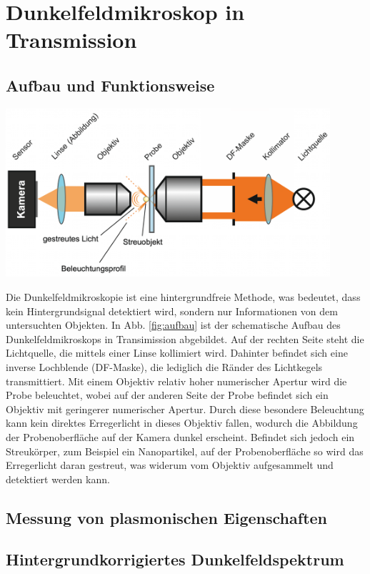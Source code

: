 
\section{Dunkelfeldmikroskop in Transmission}
\label{sec:mikroskop}

\subsection{Aufbau und Funktionsweise}
\label{sub:aufbau}

\begin{center}
    \captionsetup{type = figure}
    \includegraphics[width = 0.9\textwidth]{Bilder/Aufbau_Dunkelfeld.png}
    \label{fig:aufbau}
\end{center}

Die Dunkelfeldmikroskopie ist eine hintergrundfreie Methode, was bedeutet, dass kein Hintergrundsignal detektiert wird, sondern nur Informationen von dem untersuchten Objekten. In Abb. \ref{fig:aufbau} ist der schematische Aufbau des Dunkelfeldmikroskops in Transimission abgebildet. Auf der rechten Seite steht die Lichtquelle, die mittels einer Linse kollimiert wird. Dahinter beﬁndet sich eine inverse Lochblende (DF-Maske), die lediglich die Ränder des Lichtkegels transmittiert. Mit einem Objektiv relativ hoher numerischer Apertur wird die Probe beleuchtet, wobei auf der anderen Seite der Probe beﬁndet sich ein Objektiv mit geringerer numerischer Apertur. Durch diese besondere Beleuchtung kann kein direktes Erregerlicht in dieses Objektiv fallen, wodurch die Abbildung der Probenoberﬂäche auf der Kamera dunkel erscheint. Beﬁndet sich jedoch ein Streukörper, zum Beispiel ein Nanopartikel, auf der Probenoberﬂäche so wird das Erregerlicht daran gestreut, was widerum vom Objektiv aufgesammelt und detektiert werden kann. \cite{Anleitung}

\subsection{Messung von plasmonischen Eigenschaften}
\label{sub:messungEigenschaften}

\subsection{Hintergrundkorrigiertes Dunkelfeldspektrum}
\label{sub:korrigiertesSignal}